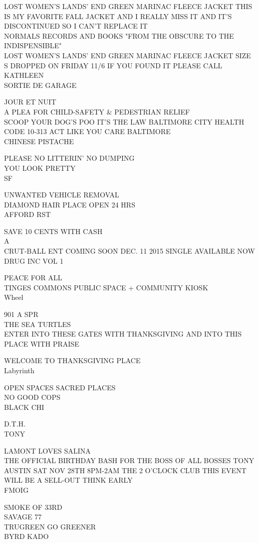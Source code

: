 \documentclass[10pt,letterpaper]{article}
\begin{document}
LOST WOMEN'S LANDS' END GREEN MARINAC FLEECE JACKET THIS IS MY FAVORITE FALL JACKET AND I REALLY MISS IT AND IT'S DISCONTINUED SO I CAN'T REPLACE IT\\
NORMALS RECORDS AND BOOKS "FROM THE OBSCURE TO THE INDISPENSIBLE"\\
LOST WOMEN'S LANDS' END GREEN MARINAC FLEECE JACKET SIZE S DROPPED ON FRIDAY 11/6 IF YOU FOUND IT PLEASE CALL KATHLEEN\\
SORTIE DE GARAGE

JOUR ET NUIT\\
A PLEA FOR CHILD{-}SAFETY \& PEDESTRIAN RELIEF\\
SCOOP YOUR DOG'S POO IT'S THE LAW BALTIMORE CITY HEALTH CODE 10{-}313 ACT LIKE YOU CARE BALTIMORE\\
CHINESE PISTACHE

PLEASE NO LITTERIN' NO DUMPING\\
YOU LOOK PRETTY\\
SF

UNWANTED VEHICLE REMOVAL\\
DIAMOND HAIR PLACE OPEN 24 HRS\\
AFFORD RST

SAVE 10 CENTS WITH CASH\\
A\\
CRUT{-}BALL ENT COMING SOON DEC. 11 2015 SINGLE AVAILABLE NOW DRUG INC VOL 1

PEACE FOR ALL\\
TINGES COMMONS PUBLIC SPACE + COMMUNITY KIOSK\\
Wheel

901 A SPR\\
THE SEA TURTLES\\
ENTER INTO THESE GATES WITH THANKSGIVING AND INTO THIS PLACE WITH PRAISE

WELCOME TO THANKSGIVING PLACE\\
Labyrinth

OPEN SPACES SACRED PLACES\\
NO GOOD COPS\\
BLACK CHI

D.T.H.\\
TONY

LAMONT LOVES SALINA\\
THE OFFICIAL BIRTHDAY BASH FOR THE BOSS OF ALL BOSSES TONY AUSTIN SAT NOV 28TH 8PM{-}2AM THE 2 O'CLOCK CLUB THIS EVENT WILL BE A SELL{-}OUT THINK EARLY\\
FMOIG

SMOKE OF 33RD\\
SAVAGE 77\\
TRUGREEN GO GREENER\\
BYRD KADO
\end{document}
